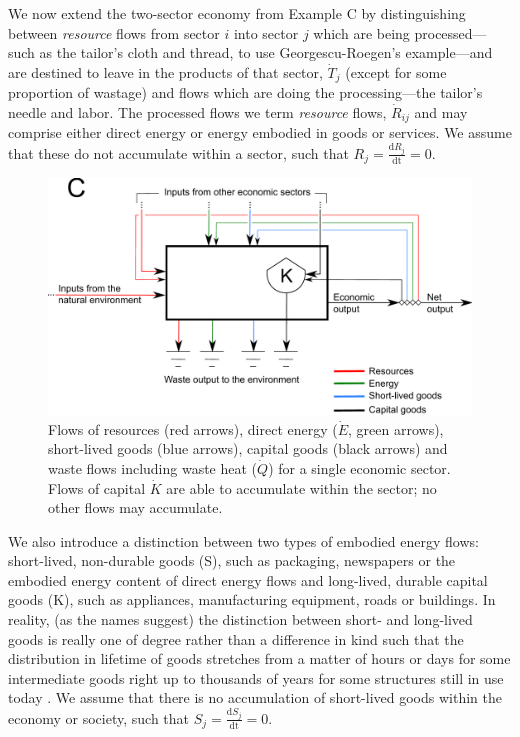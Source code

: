We now extend the two-sector economy from Example C by distinguishing between \emph{resource} flows from sector $i$ into sector $j$ which are being processed---such as the tailor's cloth and thread, to use Georgescu-Roegen's example---and are destined to leave in the products of that sector, $\dot{T}_{j}$ (except for some proportion of wastage) and flows which are doing the processing---the tailor's needle and labor. The processed flows we term \emph{resource} flows, $\dot{R}_{ij}$ and may comprise either direct energy or energy embodied in goods or services. We assume that these do not accumulate within a sector, such that $R_{j} = \frac{\textrm{d}R_{j}}{\textrm{dt}} = 0$.

\begin{figure}[h!]
\includegraphics[width=1.0\linewidth]{Chapter_Example_D/images/Basic_unit_C.pdf}
\caption{Flows of resources (red arrows), direct energy ($\dot{E}$, green arrows), short-lived goods (blue arrows), capital goods (black arrows) and waste flows including waste heat ($\dot{Q}$) for a single economic sector. Flows of capital $\dot{K}$ are able to accumulate within the sector; no other flows may accumulate.}
\label{fig:basic_unit_C}
\end{figure}

We also introduce a distinction between two types of embodied energy flows: short-lived, non-durable goods (S), such as packaging, newspapers or the embodied energy content of direct energy flows and long-lived, durable capital goods (K), such as appliances, manufacturing equipment, roads or buildings. In reality, (as the names suggest) the distinction between short- and long-lived goods is really one of degree rather than a difference in kind such that the distribution in lifetime of goods stretches from a matter of hours or days for some intermediate goods right up to thousands of years for some structures still in use today \cite{Leask2012}. We assume that there is no accumulation of short-lived goods within the economy or society, such that $S_{j} = \frac{\textrm{d}S_{j}}{\textrm{dt}} = 0$.  

